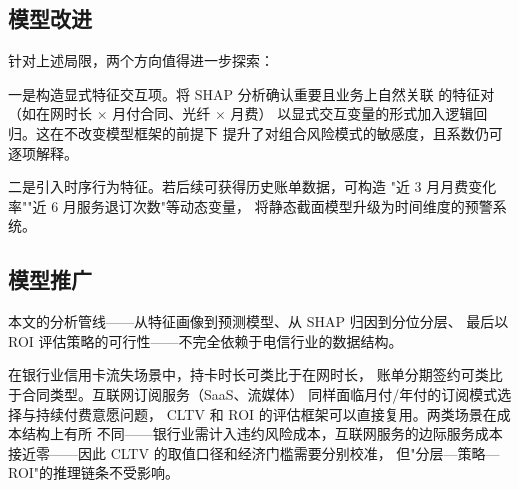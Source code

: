 \subsection{模型改进}

针对上述局限，两个方向值得进一步探索：

一是构造显式特征交互项。将 SHAP 分析确认重要且业务上自然关联
的特征对（如在网时长 $\times$ 月付合同、光纤 $\times$ 月费）
以显式交互变量的形式加入逻辑回归。这在不改变模型框架的前提下
提升了对组合风险模式的敏感度，且系数仍可逐项解释。

二是引入时序行为特征。若后续可获得历史账单数据，可构造
"近 3 月月费变化率""近 6 月服务退订次数"等动态变量，
将静态截面模型升级为时间维度的预警系统。

\subsection{模型推广}

本文的分析管线——从特征画像到预测模型、从 SHAP 归因到分位分层、
最后以 ROI 评估策略的可行性——不完全依赖于电信行业的数据结构。

在银行业信用卡流失场景中，持卡时长可类比于在网时长，
账单分期签约可类比于合同类型。互联网订阅服务（SaaS、流媒体）
同样面临月付/年付的订阅模式选择与持续付费意愿问题，
CLTV 和 ROI 的评估框架可以直接复用。两类场景在成本结构上有所
不同——银行业需计入违约风险成本，互联网服务的边际服务成本
接近零——因此 CLTV 的取值口径和经济门槛需要分别校准，
但"分层—策略—ROI"的推理链条不受影响。
